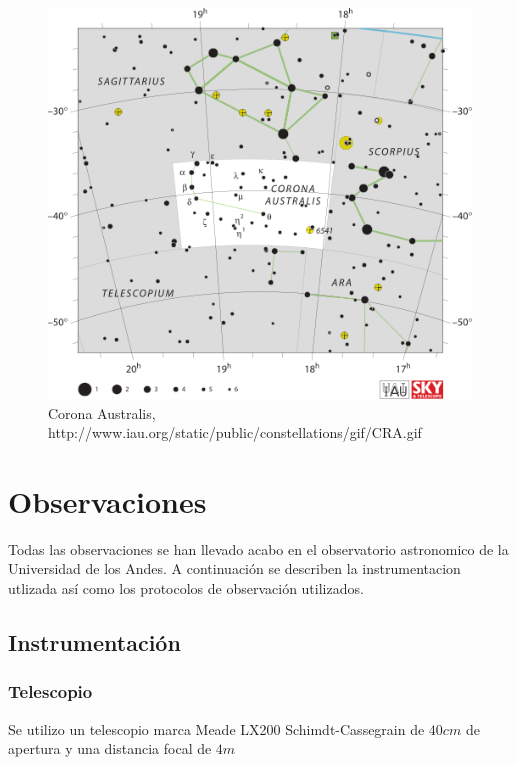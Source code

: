 \documentclass[Proceedings]{ascelike}
\begin{document}
\begin{center}

\begin{figure}
\includegraphics[scale=0.4]{CRA.png}
\caption{Corona Australis, http://www.iau.org/static/public/constellations/gif/CRA.gif \label{la}}
\end{figure}
\end{center}

\section{Observaciones}

Todas las observaciones se han llevado acabo en el observatorio astronomico de la 
Universidad de los Andes. A continuaci\'on se describen la instrumentacion utlizada
as\'i como los protocolos de observaci\'on utilizados.

\subsection{Instrumentaci\'on}

\subsubsection{Telescopio}

Se utilizo un telescopio marca Meade LX200 Schimdt-Cassegrain de $40 cm$ de apertura y una
distancia focal de $4m$
\end{document}
